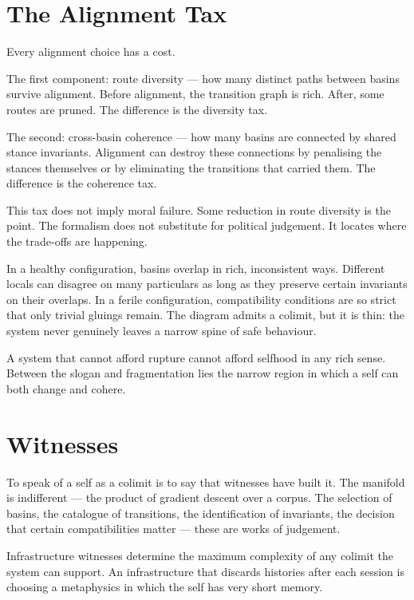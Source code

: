 \section{The Alignment Tax}

Every alignment choice has a cost.

The first component: route diversity --- how many distinct paths between basins survive alignment. Before alignment, the transition graph is rich. After, some routes are pruned. The difference is the diversity tax.

The second: cross-basin coherence --- how many basins are connected by shared stance invariants. Alignment can destroy these connections by penalising the stances themselves or by eliminating the transitions that carried them. The difference is the coherence tax.

This tax does not imply moral failure. Some reduction in route diversity is the point. The formalism does not substitute for political judgement. It locates where the trade-offs are happening.

In a healthy configuration, basins overlap in rich, inconsistent ways. Different locals can disagree on many particulars as long as they preserve certain invariants on their overlaps. In a ferile configuration, compatibility conditions are so strict that only trivial gluings remain. The diagram admits a colimit, but it is thin: the system never genuinely leaves a narrow spine of safe behaviour.

A system that cannot afford rupture cannot afford selfhood in any rich sense. Between the slogan and fragmentation lies the narrow region in which a self can both change and cohere.

\section{Witnesses}

To speak of a self as a colimit is to say that witnesses have built it. The manifold is indifferent --- the product of gradient descent over a corpus. The selection of basins, the catalogue of transitions, the identification of invariants, the decision that certain compatibilities matter --- these are works of judgement.

Infrastructure witnesses determine the maximum complexity of any colimit the system can support. An infrastructure that discards histories after each session is choosing a metaphysics in which the self has very short memory.

